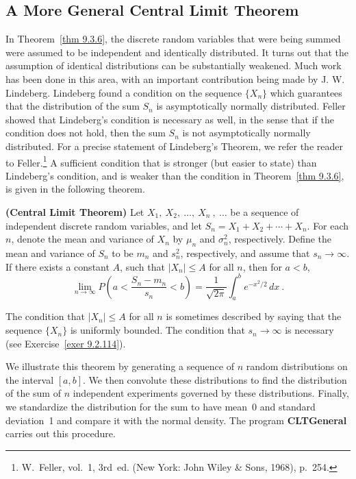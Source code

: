 \subsection*{A More General Central Limit Theorem}
In Theorem~\ref{thm 9.3.6}, the discrete random variables that were being summed were assumed to
be independent and identically distributed.  It turns out that the assumption of identical
distributions can be substantially weakened.  Much work has been done in this area, with an
important contribution being made by J. W. Lindeberg.  Lindeberg found a
condition on the sequence $\{X_n\}$ which guarantees that the distribution of the sum $S_n$ is
asymptotically normally distributed.  Feller showed that Lindeberg's condition is necessary as
well, in the sense that if the condition does not hold, then the sum $S_n$ is not asymptotically
normally distributed.  For a precise statement of Lindeberg's Theorem, we refer the reader to
Feller.\footnote{W.~Feller,  vol.~1, 3rd~ed. (New York: John Wiley \& Sons, 1968), p.~254.}  A sufficient
condition that is stronger (but easier to state) than Lindeberg's condition, and is weaker than
the condition in Theorem~\ref{thm 9.3.6}, is given in the following theorem.
\pagebreak[4]
\begin{theorem}{\bf (Central Limit Theorem)}\label{thm 9.3.7} 
Let $X_1,\ X_2,\ \ldots,\ X_n\ ,\ \ldots$ be a sequence of independent discrete random variables,
and let $S_n = X_1 + X_2 +\cdots+ X_n$.  For each $n$, denote the mean and variance of $X_n$ by
$\mu_n$ and $\sigma^2_n$, respectively.  Define the mean and variance of $S_n$ to be $m_n$ and
$s_n^2$, respectively, and assume that $s_n \rightarrow \infty$.  If there exists a constant $A$,
such that $|X_n| \le A$ for all $n$, then for $a < b$,
$$
\lim_{n \to \infty} P\left( a < \frac {S_n - m_n}{s_n} < b\right)
= \frac 1{\sqrt{2\pi}} \int_a^b e^{-x^2/2}\, dx\ .
$$
\end{theorem}
The condition that $|X_n| \le A$ for all $n$ is sometimes described by saying that the sequence
$\{X_n\}$ is uniformly bounded.  The condition that $s_n \rightarrow \infty$ is necessary (see
Exercise~\ref{exer 9.2.114}).
\par
We illustrate this theorem by generating a sequence of $n$ random distributions on
the interval $[a, b]$.  We then convolute these distributions to find the distribution of
the sum of $n$ independent experiments governed by these distributions.  Finally, we
standardize the distribution for the sum to have mean~0 and standard deviation~1
and compare it with the normal density.  The program {\bf CLTGeneral}
carries out this  procedure.


